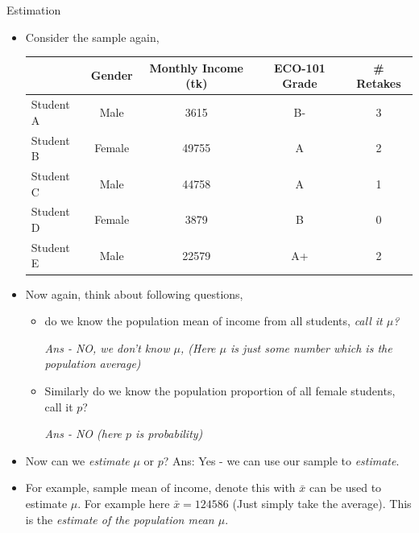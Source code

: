 \documentclass[8pt, usepdftitle=false]{beamer}
\begin{document}
\begin{frame}[allowframebreaks]{Estimation}
   
\begin{itemize}
   \item Consider the sample again,

      \medskip
      \begin{tabular}{l|c|c|c|c}
      \hline
       & Gender & Monthly Income (tk) & ECO-101 Grade & \# Retakes\\
      \hline
      Student A & Male & 3615 & B- & 3\\
      \hline
      Student B & Female & 49755 & A & 2\\
      \hline
      Student C & Male & 44758 & A & 1\\
      \hline
      Student D & Female & 3879 & B & 0\\
      \hline
      Student E & Male & 22579 & A+ & 2 \\
      \hline
      \end{tabular}



    \item Now again, think about following questions,

    \begin{itemize}
       \item do we know the \alert{population mean of income} from all students, \emph{call it $\mu$?} 

       \medskip

           \emph{Ans - NO, we don't know $\mu$, (Here $\mu$ is just some number which is the population average)}
      \medskip

      \item  Similarly  do we know the \alert{population proportion of all female students}, call it $p$? 

      \medskip
      \emph{Ans - NO (here $p$ is probability)}
      \medskip 


    \end{itemize}



  \item Now can we \emph{estimate}  $\mu$ or $p$? Ans: Yes - we can use our sample to \emph{estimate}. 

  \item For example, \alert{sample mean of income}, denote this with $\bar{x}$ can be used to estimate $\mu$. For example here $\bar{x} = 124586$ (Just simply take the average). This is the \emph{estimate of the population mean $\mu$}.


\end{itemize}
\end{frame}
\end{document}
